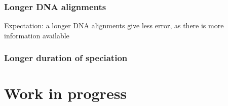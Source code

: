 \documentclass{beamer}
\begin{document}
\begin{frame}
  \frametitle{Longer DNA alignments}

  Expectation: a longer DNA alignments give less error, as there is more information available

\end{frame}

\begin{frame}
  \frametitle{Longer duration of speciation}

  \begin{figure}[]
    
  \end{figure}

\end{frame}

\section[Work in progress]{Work in progress}
\end{document}

